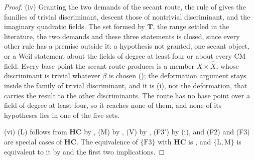 \documentclass[11pt,reqno]{amsart}
\theoremstyle{plain}
\theoremstyle{definition}
\theoremstyle{remark}
\begin{document}
\begin{proof}
(iv) Granting the two demands of the secant route, the rule of
\cite[Proposition~15.19]{paperI} gives the families of trivial discriminant, descent
those of nontrivial discriminant, and  the imaginary
quadratic fields. The set formed by $\mathbf{T}$, the range settled in the
literature, the two demands and these three statements is closed, since
every other rule has a premise outside it: a hypothesis not granted, one
secant object, or a Weil statement about the fields of degree at least four
or about every CM field. Every base point the secant route produces is a
member $X\times\widehat{X}$, whose discriminant is trivial whatever $\beta$
is chosen (\cite[Proposition~15.19(ii)]{paperI}); the deformation argument stays inside
the family of trivial discriminant, and it is (i), not
the deformation, that carries the result to the other discriminants. The
route has no base point over a field of degree at least four, so it reaches
none of them, and none of its hypotheses lies in one of the five sets.

(vi) \textup{(L)} follows from $\mathbf{HC}$ by \cite[Theorem~12.2]{paperI},
\textup{(M)} by , \textup{(V)} by ,
(F3$'$) by (i), and (F2) and (F3) are special cases of
$\mathbf{HC}$. The equivalence of $\{\mathrm{F3}\}$ with $\mathbf{HC}$ is
, and $\{\mathrm{L},\mathrm{M}\}$ is equivalent to it by
 and the first two implications.
\end{proof}
\end{document}
